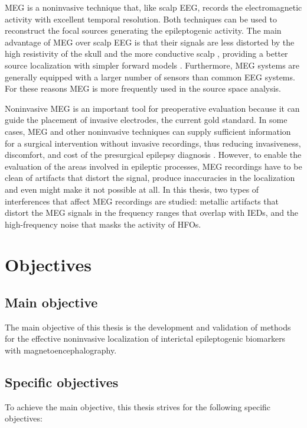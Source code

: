 MEG is a noninvasive technique that, like scalp EEG, records the electromagnetic activity with excellent temporal resolution. Both techniques can be used to reconstruct the focal sources generating the epileptogenic activity. The  main advantage of MEG over scalp EEG is that their signals are less distorted by the high resistivity of the skull and the more conductive scalp \citep{Cuffin1979}, providing a better source localization with simpler forward models \citep{Klamer2015}. Furthermore, MEG systems are generally equipped with a larger number of sensors than common EEG systems. For these reasons MEG is more frequently used in the source space analysis. 

Noninvasive MEG is an important tool for preoperative evaluation because it can guide the placement of invasive electrodes, the current gold standard. In some cases, MEG and other noninvasive techniques can supply sufficient information for a surgical intervention without invasive recordings, thus reducing invasiveness, discomfort, and cost of the presurgical epilepsy diagnosis \citep{Aydin2015}. However, to enable the evaluation of the areas involved in epileptic processes, MEG recordings have to be clean of artifacts that distort the signal, produce inaccuracies in the localization and even might make it not possible at all. In this thesis, two types of interferences that affect MEG recordings are studied: metallic artifacts that distort the MEG signals in the frequency ranges that overlap with IEDs, and the high-frequency noise that masks the activity of HFOs. 

     \section{Objectives}
     
     	\subsection*{Main objective}
        The main objective of this thesis is the development and validation of methods for the effective noninvasive localization of interictal epileptogenic biomarkers with magnetoencephalography. 
        
        \subsection*{Specific objectives}
        
To achieve the main objective, this thesis strives for the following specific objectives:

